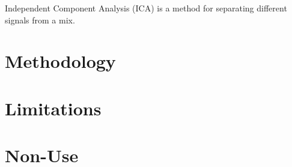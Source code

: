 Independent Component Analysis (ICA) is a method for separating different signals from a mix.

\section{Methodology}

\section{Limitations}

\section{Non-Use}

